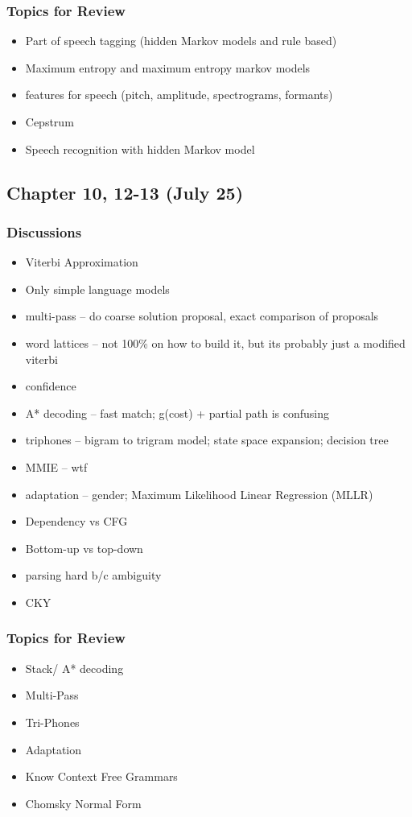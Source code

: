 \subsubsection*{Topics for Review}
\begin{itemize}
\item Part of speech tagging (hidden Markov models and rule based)
\item Maximum entropy and maximum entropy markov models
\item features for speech (pitch, amplitude, spectrograms, formants)
\item Cepstrum
\item Speech recognition with hidden Markov model
\end{itemize}

\subsection{Chapter 10, 12-13 (July 25)}
\subsubsection*{Discussions}
\begin{itemize}
\item Viterbi Approximation
\item Only simple language models
\item multi-pass -- do coarse solution proposal, exact comparison of proposals
\item word lattices -- not 100\% on how to build it, but its probably just a modified viterbi
\item confidence
\item A* decoding -- fast match; g(cost) + partial path is confusing
\item triphones -- bigram to trigram model; state space expansion; decision tree
\item MMIE -- wtf
\item adaptation -- gender; Maximum Likelihood Linear Regression (MLLR)
\item Dependency vs CFG
\item Bottom-up vs top-down
\item parsing hard b/c ambiguity
\item CKY 
\end{itemize}
\subsubsection*{Topics for Review}
\begin{itemize}
\item Stack/ A* decoding
\item Multi-Pass
\item Tri-Phones
\item Adaptation
\item Know Context Free Grammars
\item Chomsky Normal Form
\end{itemize}
